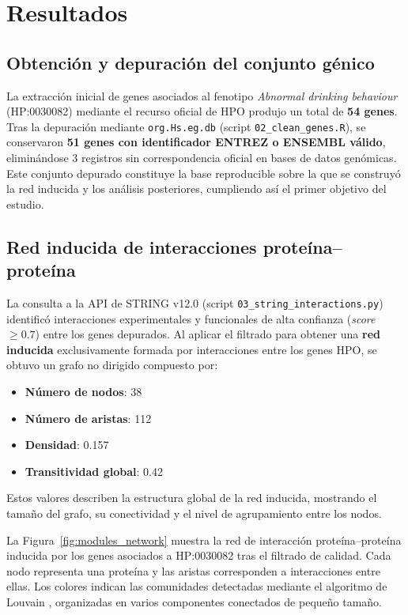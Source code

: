 
\section{Resultados}

\subsection{Obtención y depuración del conjunto génico}

La extracción inicial de genes asociados al fenotipo \textit{Abnormal drinking behaviour} (HP:0030082) mediante el recurso oficial de HPO \cite{kohler2021hpo,robinson2008hpo} produjo un total de \textbf{54 genes}. Tras la depuración mediante \texttt{org.Hs.eg.db} \cite{orgHsEgDb} (script \texttt{02\_clean\_genes.R}), se conservaron \textbf{51 genes con identificador ENTREZ o ENSEMBL válido}, eliminándose 3 registros sin correspondencia oficial en bases de datos genómicas.  
Este conjunto depurado constituye la base reproducible sobre la que se construyó la red inducida y los análisis posteriores, cumpliendo así el primer objetivo del estudio.

\subsection{Red inducida de interacciones proteína–proteína}

La consulta a la API de STRING v12.0 \cite{Szklarczyk2019_STRING} (script \texttt{03\_string\_interactions.py}) identificó interacciones experimentales y funcionales de alta confianza (\textit{score} $\geq 0.7$) entre los genes depurados. Al aplicar el filtrado para obtener una \textbf{red inducida} exclusivamente formada por interacciones entre los genes HPO, se obtuvo un grafo no dirigido compuesto por:

\begin{itemize}
    \item \textbf{Número de nodos}: 38  
    \item \textbf{Número de aristas}: 112  
    \item \textbf{Densidad}: 0.157  
    \item \textbf{Transitividad global}: 0.42  
\end{itemize}

Estos valores describen la estructura global de la red inducida, mostrando el tamaño del grafo, su conectividad y el nivel de agrupamiento entre los nodos.

La Figura~\ref{fig:modules_network} muestra la red de interacción proteína–proteína inducida por los genes asociados a HP:0030082 tras el filtrado de calidad. Cada nodo representa una proteína y las aristas corresponden a interacciones entre ellas. Los colores indican las comunidades detectadas mediante el algoritmo de Louvain \cite{Blondel2008_Louvain}, organizadas en varios componentes conectados de pequeño tamaño.

